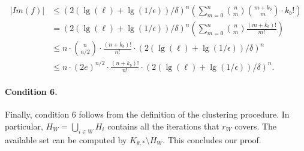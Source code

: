 
\begin{align*}
|Im(f)| &\leq \left (2 (\lg(\ell) + \lg (1/\epsilon)) /\delta \right )^n \left ( \sum_{m=0}^n {n \choose m} {m + k_b \choose m} \cdot k_b! \right )\\ 
&= \left (2 (\lg(\ell) + \lg (1/\epsilon)) /\delta \right )^n \left ( \sum_{m=0}^n {n \choose m}\frac{(m+k_b)!}{m!} \right )\\ 
&\leq n \cdot {n \choose n/2} \cdot \frac{(n+k_b)!}{n!} \cdot \left ( 2(\lg(\ell) + \lg (1/\epsilon)) /\delta \right )^{n}\\
&\leq n \cdot (2e)^{n/2} \cdot \frac{(n+k_b)!}{n!} \cdot \left ( 2(\lg(\ell) + \lg (1/\epsilon)) /\delta \right )^{n}.
\end{align*}

\paragraph{Condition 6.}
Finally, condition 6 follows from the definition of the clustering procedure. In particular, $H_W = \bigcup_{i \in W} H_i$ contains all the iterations that $r_W$ covers. The available set can be computed by $K_{\theta,*} \setminus H_W$. This concludes our proof. 


